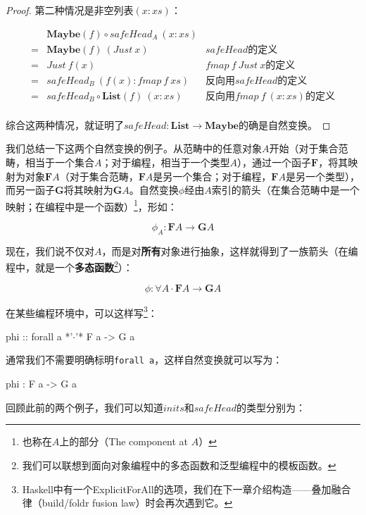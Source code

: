 \documentclass[b5paper]{ctexart}
\begin{document}
\begin{example}
\begin{proof}
第二种情况是非空列表$(x:xs)$：

\[
\begin{array}{cll}
  & \mathbf{Maybe}(f) \circ safeHead_A\ (x:xs) & \\
= & \mathbf{Maybe}(f)\ (Just\ x) & \text{$safeHead$的定义} \\
= & Just\ f(x) & \text{$fmap\ f\ Just\ x$的定义} \\
= & safeHead_B\ (f(x) : fmap\ f\ xs) & \text{反向用$safeHead$的定义} \\
= & safeHead_B \circ \mathbf{List}(f)\ (x:xs) & \text{反向用$fmap\ f\ (x:xs)$的定义} \\
\end{array}
\]

综合这两种情况，就证明了$safeHead : \mathbf{List} \to \mathbf{Maybe}$的确是自然变换。
\end{proof}
\end{example}

我们总结一下这两个自然变换的例子。从范畴中的任意对象$A$开始（对于集合范畴，相当于一个集合$A$；对于编程，相当于一个类型$A$），通过一个函子$\mathbf{F}$，将其映射为对象$\mathbf{F}A$（对于集合范畴，$\mathbf{F}A$是另一个集合；对于编程，$\mathbf{F}A$是另一个类型），而另一函子$\mathbf{G}$将其映射为$\mathbf{G}A$。自然变换$\phi$经由$A$索引的箭头（在集合范畴中是一个映射；在编程中是一个函数）\footnote{也称在$A$上的部分（The component at $A$）}，形如：

\[
\phi_A : \mathbf{F} A \to \mathbf{G} A
\]

现在，我们说不仅对$A$，而是对\textbf{所有}对象进行抽象，这样就得到了一族箭头（在编程中，就是一个\textbf{多态函数}\footnote{我们可以联想到面向对象编程中的多态函数和泛型编程中的模板函数。}）：

\[
\phi : \forall A \cdot \mathbf{F} A \to \mathbf{G} A
\]

在某些编程环境中，可以这样写\footnote{Haskell中有一个ExplicitForAll的选项，我们在下一章介绍构造——叠加融合律（build/foldr fusion law）时会再次遇到它。}：

\lstset{frame=single}
\begin{Haskell}
phi :: forall a *'$\cdot$'* F a -> G a
\end{Haskell}

通常我们不需要明确标明\texttt{forall a}，这样自然变换就可以写为：

\begin{Haskell}
phi : F a -> G a
\end{Haskell}

回顾此前的两个例子，我们可以知道$inits$和$safeHead$的类型分别为：
\end{document}

